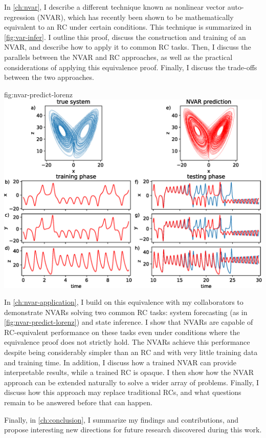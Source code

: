 In \cref{ch:nvar}, I describe a different technique known as nonlinear
vector auto-regression (NVAR), which has recently been shown to be
mathematically equivalent to an RC under certain conditions.  This
technique is summarized in \cref{fig:var-infer}.  I outline this
proof, discuss the construction and training of an NVAR, and describe
how to apply it to common RC tasks. Then, I discuss the parallels
between the NVAR and RC approaches, as well as the practical
considerations of applying this equivalence proof. Finally, I discuss
the trade-offs between the two approaches.

\begin{reusefigure}{fig:nvar-predict-lorenz}
  \includegraphics[width=\textwidth]{figures/nvar-predict-lorenz}
  \caption{The true Lorenz attractor (a) and NVAR predicted attractor
    (e) for a single training trial. (b) -- (d) True Lorenz system
    (blue) during training overlaid with NVAR output (red) calculated
    after training is complete. (f) -- (h) True (blue) and NVAR
    forecasted output (red). The NVAR shows good agreement with the
    true system as far as $5$ Lyapunov periods in to the autonomous
    forecast.}
\end{reusefigure}

In \cref{ch:nvar-application}, I build on this equivalence with my
collaborators to demonstrate NVARs solving two common RC tasks: system
forecasting (as in \cref{fig:nvar-predict-lorenz}) and state
inference.  I show that NVARs are capable of RC-equivalent performance
on these tasks even under conditions where the equivalence proof does
not strictly hold. The NVARs achieve this performance despite being
considerably simpler than an RC and with very little training data and
training time. In addition, I discuss how a trained NVAR can provide
interpretable results, while a trained RC is opaque. I then show how
the NVAR approach can be extended naturally to solve a wider array of
problems. Finally, I discuss how this approach may replace traditional
RCs, and what questions remain to be answered before that can happen.

Finally, in \cref{ch:conclusion}, I summarize my findings and
contributions, and propose interesting new directions for future
research discovered during this work.

